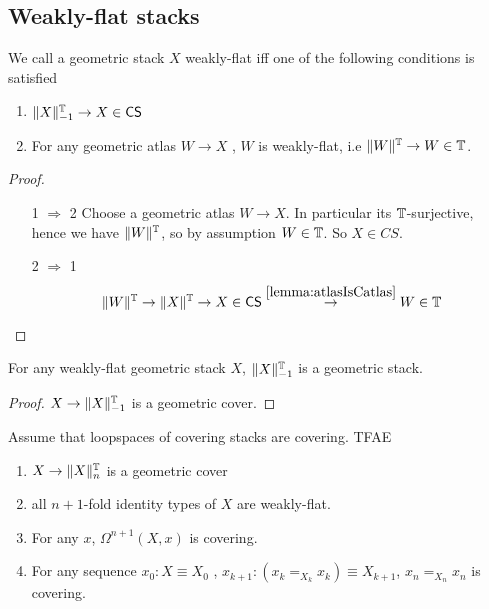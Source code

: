 \documentclass{article}
\newcommand{\CS}{\mathsf{CS}}
\begin{document}
\subsection{Weakly-flat stacks}
\begin{definition}
	We call a geometric stack $X$ weakly-flat iff one of the following conditions is satisfied
	\begin{enumerate}
		\item $\|X\|_{-1}^\bT \to X \in \CS$
		\item For any geometric atlas $W \to X$ , $W$ is weakly-flat, i.e $\|W\|^{\mathbb{T}} \to W \in \mathbb{T}$.
	\end{enumerate}

\end{definition}
\begin{proof}
	\ \begin{enumerate}
		\item [1 $\Rightarrow$ 2] Choose a geometric atlas $W \to X$. In particular its $\mathbb{T}$-surjective, hence we have $\|W\|^{\mathbb{T}}$, so by assumption $W \in \mathbb{T}$. So $X \in CS$.
		\item [2 $\Rightarrow$ 1] 
		\[\|W\|^\bT \to \|X\|^\bT \to X \in \CS \overset{\ref{lemma:atlasIsCatlas}}{\to} W \in \bT \]
	\end{enumerate}
\end{proof}
%
\begin{lemma}
For any weakly-flat geometric stack $X$, $\|X\|_{-1}^{\mathbb{T}}$ is a geometric stack.
\end{lemma}
\begin{proof}
	$X \to \|X\|_{-1}^{\mathbb{T}}$ is a geometric cover.
\end{proof}
\begin{prop}{\label{prop:TruncationCover}}
	Assume that loopspaces of covering stacks are covering. TFAE
	\begin{enumerate}
		\item $X \to \|X\|_n^{\mathbb{T}}$ is a geometric cover
		\item  all $n+1$-fold identity types of $X$ are weakly-flat.
	
		\item For any $x$, $\Omega^{n+1} (X , x)$ is covering.
			\item For any sequence $x_0 : X \equiv X_0$ , $x_{k+1} : (x_{k} =_{X_k} x_k) \equiv X_{k+1}$, $x_n =_{X_n} x_n$ is covering.
	\end{enumerate}

\end{prop}
\end{document}
